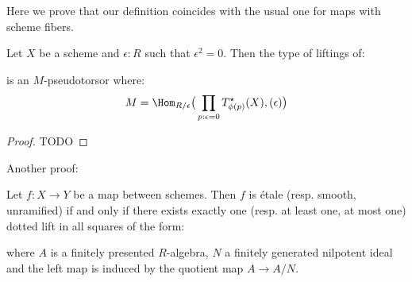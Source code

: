 Here we prove that our definition coincides with the usual one for maps with scheme fibers.

\begin{lemma}\label{lifting-is-torsor}
Let $X$ be a scheme and $\epsilon:R$ such that $\epsilon^2=0$. Then the type of liftings of:
 \begin{center}
    \end{center} 
is an $M$-pseudotorsor where:
\[M = \Hom_{R/\epsilon}\big(\prod_{p:\epsilon=0}T^\star_{\phi(p)}(X),(\epsilon)\big)\]
\end{lemma}

\begin{proof}
TODO
\end{proof}

Another proof:
\begin{remark}
  \label{connection-to-ega-definition}
  Let $f:X\to Y$ be a map between schemes.
  Then $f$ is étale (resp. smooth, unramified) if and only if there exists exactly one (resp. at least one, at most one) dotted lift in all squares of the form:
  \begin{center}
  \end{center}
where $A$ is a finitely presented $R$-algebra, $N$ a finitely generated nilpotent ideal and the left map is induced by the quotient map $A\to A/N$. 
\end{remark}

